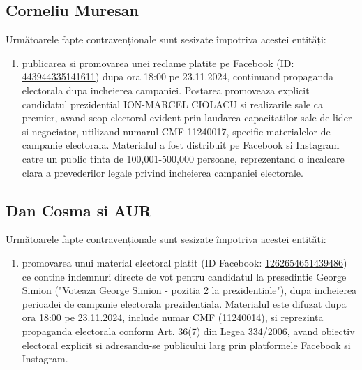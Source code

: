 \documentclass[a4paper,12pt]{article}
\begin{document}
\vspace{0.5cm}

\subsection{Corneliu Muresan}
Următoarele fapte contravenționale sunt sesizate împotriva acestei entități:

\begin{enumerate}[leftmargin=*, label=\arabic*.)]
    \item publicarea si promovarea unei reclame platite pe Facebook (ID: \href{https://www.facebook.com/ads/library/?id=443944335141611}{443944335141611}) dupa ora 18:00 pe 23.11.2024, continuand propaganda electorala dupa incheierea campaniei. Postarea promoveaza explicit candidatul prezidential ION-MARCEL CIOLACU si realizarile sale ca premier, avand scop electoral evident prin laudarea capacitatilor sale de lider si negociator, utilizand numarul CMF 11240017, specific materialelor de campanie electorala. Materialul a fost distribuit pe Facebook si Instagram catre un public tinta de 100,001-500,000 persoane, reprezentand o incalcare clara a prevederilor legale privind incheierea campaniei electorale.
\end{enumerate}

\vspace{0.5cm}

\subsection{Dan Cosma si AUR}
Următoarele fapte contravenționale sunt sesizate împotriva acestei entități:

\begin{enumerate}[leftmargin=*, label=\arabic*.)]
    \item promovarea unui material electoral platit (ID Facebook: \href{https://www.facebook.com/ads/library/?id=1262654651439486}{1262654651439486}) ce contine indemnuri directe de vot pentru candidatul la presedintie George Simion ("Voteaza George Simion - pozitia 2 la prezidentiale"), dupa incheierea perioadei de campanie electorala prezidentiala. Materialul este difuzat dupa ora 18:00 pe 23.11.2024, include numar CMF (11240014), si reprezinta propaganda electorala conform Art. 36(7) din Legea 334/2006, avand obiectiv electoral explicit si adresandu-se publicului larg prin platformele Facebook si Instagram.
\end{enumerate}

\vspace{0.5cm}
\end{document}
